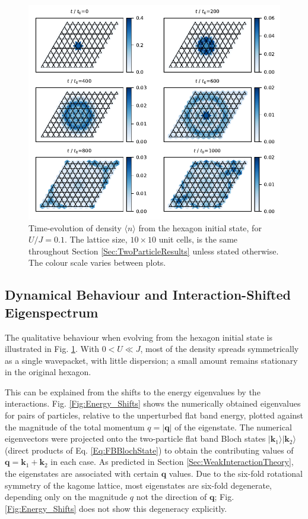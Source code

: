 \begin{figure}[p!]
    \centering
    \includegraphics[width=\textwidth]{Figures/Hexagon_Evolution}
    \caption{Time-evolution of density $\langle n \rangle$ from the hexagon initial state, for $U/J=0.1$. The lattice size, $10\times10$ unit cells, is the same throughout Section \ref{Sec:TwoParticleResults} unless stated otherwise. The colour scale varies between plots.}
    \label{Fig:Hexagon_Evolution}
\end{figure}

\newpage

\subsection{Dynamical Behaviour and Interaction-Shifted Eigenspectrum}\label{Sec:HexagonQualitative}

The qualitative behaviour when evolving from the hexagon initial state is illustrated in Fig. \ref{Fig:Hexagon_Evolution}. With $0<U\ll J$, most of the density spreads symmetrically as a single wavepacket, with little dispersion; a small amount remains stationary in the original hexagon. 

This can be explained from the shifts to the energy eigenvalues by the interactions. Fig. \ref{Fig:Energy_Shifts} shows the numerically obtained eigenvalues for pairs of particles, relative to the unperturbed flat band energy, plotted against the magnitude of the total momentum $q=|\textbf{q}|$ of the eigenstate. The numerical eigenvectors were projected onto the two-particle flat band Bloch states $|\textbf{k}_1\rangle |\textbf{k}_2\rangle$ (direct products of Eq. \ref{Eq:FBBlochState}) to obtain the contributing values of $\textbf{q}=\textbf{k}_1+\textbf{k}_2$ in each case. As predicted in Section \ref{Sec:WeakInteractionTheory}, the eigenstates are associated with certain $\textbf{q}$ values. Due to the six-fold rotational symmetry of the kagome lattice, most eigenstates are six-fold degenerate, depending only on the magnitude $q$ not the direction of $\textbf{q}$; Fig. \ref{Fig:Energy_Shifts} does not show this degeneracy explicitly. 


